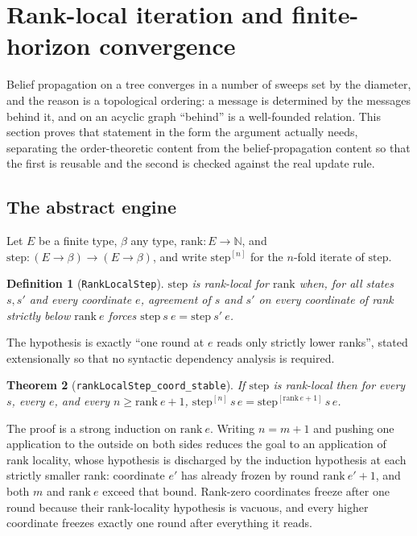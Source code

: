 \documentclass[aps,prx,reprint,nofootinbib,floatfix]{revtex4-2}
\newtheorem{thm}{Theorem}
\newtheorem{defn}[thm]{Definition}
\begin{document}
\section{Rank-local iteration and finite-horizon convergence}
\label{sec:convergence}

Belief propagation on a tree converges in a number of sweeps set by the
diameter, and the reason is a topological ordering: a message is determined by
the messages behind it, and on an acyclic graph ``behind'' is a well-founded
relation. This section proves that statement in the form the argument actually
needs, separating the order-theoretic content from the belief-propagation
content so that the first is reusable and the second is checked against the
real update rule.

\subsection{The abstract engine}

Let $E$ be a finite type, $\beta$ any type, $\mathrm{rank} : E \to \mathbb{N}$,
and $\mathrm{step} : (E \to \beta) \to (E \to \beta)$, and write
$\mathrm{step}^{[n]}$ for the $n$-fold iterate of $\mathrm{step}$.

\begin{defn}[\texttt{RankLocalStep}]
$\mathrm{step}$ is \emph{rank-local} for $\mathrm{rank}$ when, for all states
$s, s'$ and every coordinate $e$, agreement of $s$ and $s'$ on every coordinate
of rank strictly below $\mathrm{rank}\ e$ forces
$\mathrm{step}\ s\ e = \mathrm{step}\ s'\ e$.
\end{defn}

The hypothesis is exactly ``one round at $e$ reads only strictly lower ranks'',
stated extensionally so that no syntactic dependency analysis is required.

\begin{thm}[\texttt{rankLocalStep\_coord\_stable}]
\label{thm:coordstable}
If $\mathrm{step}$ is rank-local then for every $s$, every $e$, and every
$n \geq \mathrm{rank}\ e + 1$,
$\mathrm{step}^{[n]}\, s\, e = \mathrm{step}^{[\mathrm{rank}\, e + 1]}\, s\, e$.
\end{thm}

The proof is a strong induction on $\mathrm{rank}\ e$. Writing
$n = m+1$ and pushing one application to the outside on both sides reduces the
goal to an application of rank locality, whose hypothesis is discharged by the
induction hypothesis at each strictly smaller rank: coordinate $e'$ has already
frozen by round $\mathrm{rank}\ e' + 1$, and both $m$ and $\mathrm{rank}\ e$
exceed that bound. Rank-zero coordinates freeze after one round because their
rank-locality hypothesis is vacuous, and every higher coordinate freezes exactly
one round after everything it reads.
\end{document}
